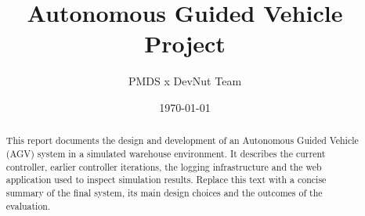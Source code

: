 \documentclass[11pt,a4paper]{article}
\title{Autonomous Guided Vehicle Project}
\author{PMDS x DevNut Team}
\date{\today}
\begin{document}
\maketitle

\begin{abstract}
This report documents the design and development of an Autonomous Guided Vehicle (AGV) system in a simulated warehouse environment. It describes the current controller, earlier controller iterations, the logging infrastructure and the web application used to inspect simulation results. Replace this text with a concise summary of the final system, its main design choices and the outcomes of the evaluation.
\end{abstract}

\tableofcontents
\newpage





\end{document}
